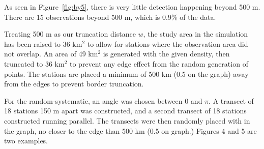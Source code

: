 \documentclass[12pt]{article}
\begin{document}
As seen in Figure~\ref{fig:by5}, there is very little detection happening beyond 500 m. There are 15 observations beyond 500 m, which is 0.9\% of the data. 

Treating 500 m as our truncation distance $w$, the study area in the simulation has been raised to 36 km$^2$ to allow for stations where the observation area did not overlap. An area of 49 km$^2$ is generated with the given density, then truncated to 36 km$^2$ to prevent any edge effect from the random generation of points. The stations are placed a minimum of 500 km (0.5 on the graph) away from the edges to prevent border truncation. 

For the random-systematic, an angle was chosen between $0$ and $\pi$. A transect of 18 stations 150 m apart was constructed, and a second transect of 18 stations constructed running parallel. The transects were then randomly placed with in the graph, no closer to the edge than 500 km (0.5 on graph.) Figures 4 and 5 are two examples.
\end{document}
